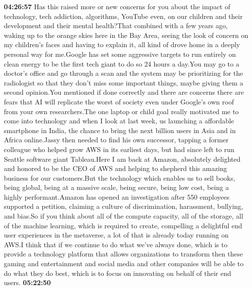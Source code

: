 \documentclass{article}%
\begin{document}
\textbf{04:26:57}%
\newline%
Has this raised more or new concerns for you about the impact of technology, tech addiction, algorithms, YouTube even, on our children and their development and their mental health?That combined with a few years ago, waking up to the orange skies here in the Bay Area, seeing the look of concern on my children's faces and having to explain it, all kind of drove home in a deeply personal way for me.Google has set some aggressive targets to run entirely on clean energy to be the first tech giant to do so 24 hours a day.You may go to a doctor's office and go through a scan and the system may be prioritizing for the radiologist so that they don't miss some important things, maybe giving them a second opinion.You mentioned if done correctly and there are concerns there are fears that AI will replicate the worst of society even under Google's own roof from your own researchers.The one laptop or child goal really motivated me to come into technology and when I look at last week, us launching a affordable smartphone in India, the chance to bring the next billion users in Asia and in Africa online.Jassy then needed to find his own successor, tapping a former colleague who helped grow AWS in its earliest days, but had since left to run Seattle software giant Tableau.Here I am back at Amazon, absolutely delighted and honored to be the CEO of AWS and helping to shepherd this amazing business for our customers.But the technology which enables us to sell books, being global, being at a massive scale, being secure, being low cost, being a highly performant.Amazon has opened an investigation after 550 employees supported a petition, claiming a culture of discrimination, harassment, bullying, and bias.So if you think about all of the compute capacity, all of the storage, all of the machine learning, which is required to create, compelling a delightful end user experiences in the metaverse, a lot of that is already today running on AWS.I think that if we continue to do what we've always done, which is to provide a technology platform that allows organizations to transform then these gaming and entertainment and social media and other companies will be able to do what they do best, which is to focus on innovating on behalf of their end users.%
\textbf{05:22:50}%
\newline%
\end{document}
